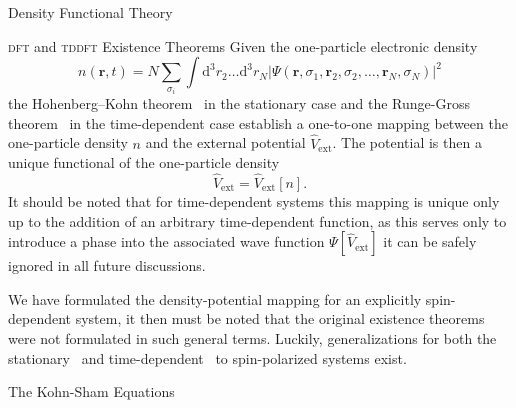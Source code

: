 \documentclass[letterpaper, 10 pt]{report}
\begin{document}
\begin{chapter}{Density Functional Theory \label{chap:dft}}
\begin{section}{\textsc{dft} and \textsc{tddft} Existence Theorems \label{sec:dft}}
      Given the one-particle electronic density
      \begin{equation} \label{eq:dendef1}
         n(\mathbf{r}, t) = N \sum\limits_{\sigma_i} \int \mathrm{d}^3 r_2 \dots \mathrm{d}^3 r_N
                            \left| \Psi(\mathbf{r}, \sigma_1, \mathbf{r}_2, \sigma_2, \dots,
                                   \mathbf{r}_N, \sigma_N) \right|^2
      \end{equation}
      the Hohenberg–Kohn theorem~\cite{hk-theorem} in the stationary case and the Runge-Gross
      theorem~\cite{rgt} in the time-dependent case establish a one-to-one mapping between the
      one-particle density $n$ and the external potential $\hat{V}_\mathrm{ext}$. The potential is
      then a unique functional of the one-particle density
      \begin{equation} \label{eq:vext-func}
         \hat{V}_\mathrm{ext} = \hat{V}_\mathrm{ext} [n].
      \end{equation}
      It should be noted that for time-dependent systems this mapping is unique only up to the addition
      of an arbitrary time-dependent function, as this serves only to introduce a phase into the
      associated wave function $\Psi[\hat{V}_\mathrm{ext}]$ it can be safely ignored in all future
      discussions.

      We have formulated the density-potential mapping for an explicitly spin-dependent system, it
      then must be noted that the original existence theorems were not formulated in such general terms.
      Luckily, generalizations for both the stationary~\cite{spin-dep1, spin-dep2} and
      time-dependent~\cite{td-spindep} to spin-polarized systems exist.

   \end{section}

   \begin{section}{The Kohn-Sham Equations \label{sec:ks}}


\end{section}
\end{chapter}
\end{document}
